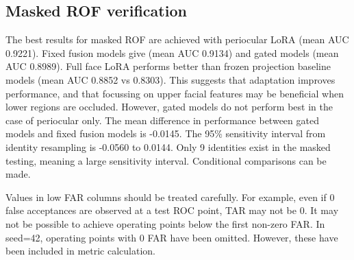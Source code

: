 \documentclass[10pt,lettersize,journal]{IEEEtran}
\begin{document}
\subsection{Masked ROF verification}
The best results for masked ROF are achieved with periocular LoRA (mean AUC 0.9221). Fixed fusion models give (mean AUC 0.9134) and gated models (mean AUC 0.8989). Full face LoRA performs better than frozen projection baseline models (mean AUC 0.8852 vs 0.8303). This suggests that adaptation improves performance, and that focussing on upper facial features may be beneficial when lower regions are occluded. However, gated models do not perform best in the case of periocular only. The mean difference in performance between gated models and fixed fusion models is -0.0145. The 95\% sensitivity interval from identity resampling is -0.0560 to 0.0144. Only 9 identities exist in the masked testing, meaning a large sensitivity interval. Conditional comparisons can be made.\par
Values in low FAR columns should be treated carefully. For example, even if 0 false acceptances are observed at a test ROC point, TAR may not be 0. It may not be possible to achieve operating points below the first non-zero FAR. In seed=42, operating points with 0 FAR have been omitted. However, these have been included in metric calculation.\par
\end{document}
